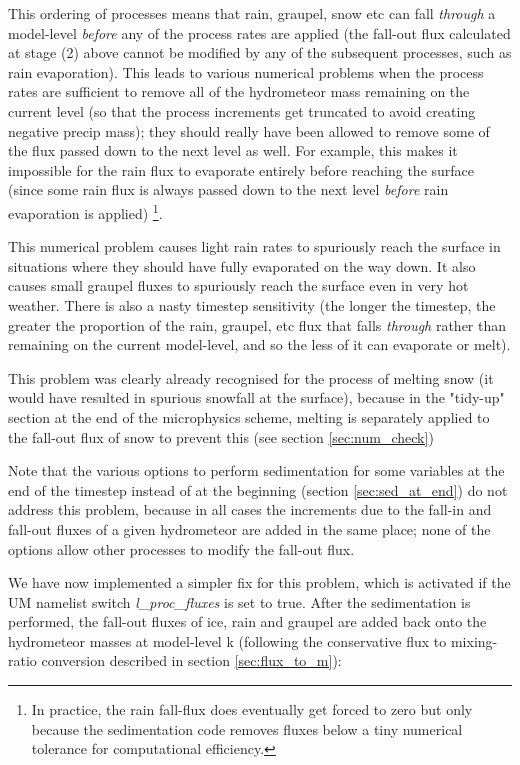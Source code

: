 \documentclass{UMDP_article}
\begin{document}
This ordering of processes means that rain, graupel, snow etc can fall
{\em through} a model-level {\em before} any of the process rates are applied
(the fall-out flux calculated at stage (2) above cannot be modified by any of
the subsequent processes, such as rain evaporation).
This leads to various numerical problems when the process rates are
sufficient to remove all of the hydrometeor mass remaining on the
current level (so that the process increments get truncated to avoid
creating negative precip mass); they should really have been allowed to
remove some of the flux passed down to the next level as well.
For example, this makes it impossible for the rain flux to evaporate
entirely before reaching the surface (since some rain flux is always
passed down to the next level {\em before} rain evaporation is applied)
\footnote{In practice, the rain fall-flux does eventually get forced to
zero but only because the sedimentation code removes fluxes below
a tiny numerical tolerance for computational efficiency.}.

This numerical problem causes light rain rates to spuriously reach the
surface in situations where they should have fully evaporated
on the way down. It also causes small graupel fluxes to spuriously
reach the surface even in very hot weather.
There is also a nasty timestep sensitivity (the longer the timestep,
the greater the proportion of the rain, graupel, etc flux that falls
{\em through} rather than remaining on the current model-level,
and so the less of it can evaporate or melt).

This problem was clearly already recognised for the process of melting snow
(it would have resulted in spurious snowfall at the surface),
because in the "tidy-up" section at the end of the microphysics scheme,
melting is separately applied to the fall-out flux of snow to prevent this
(see section \ref{sec:num_check})

Note that the various options to perform sedimentation for some variables
at the end of the timestep instead of at the beginning
(section \ref{sec:sed_at_end})
do not address this problem, because in all cases the increments due to the
fall-in and fall-out fluxes of a given hydrometeor are added in the same place;
none of the options allow other processes to modify the fall-out flux.

We have now implemented a simpler fix for this problem, which is activated
if the UM namelist switch \textit{l\_proc\_fluxes} is set to true.
After the sedimentation is performed, the fall-out fluxes of ice, rain and
graupel are added back onto the hydrometeor masses at model-level k
(following the conservative flux to mixing-ratio conversion described in
section \ref{sec:flux_to_m}):
\end{document}
